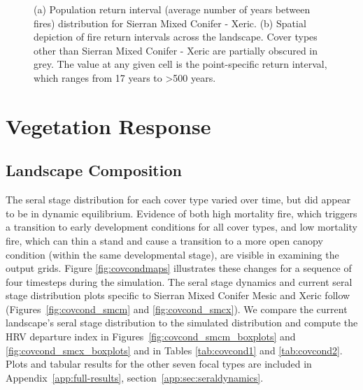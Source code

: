 \begin{figure}[!htbp]
  \centering
  \caption{(a) Population return interval (average number of years between fires) distribution for Sierran Mixed Conifer - Xeric.  (b) Spatial depiction of fire return intervals across the landscape. Cover types other than Sierran Mixed Conifer - Xeric are partially obscured in grey. The value at any given cell is the point-specific return interval, which ranges from 17 years to \textgreater 500 years.}
\label{fig:preturn_smcx}
\end{figure}

\clearpage



\section{Vegetation Response}
\label{subsec:HRVvegresponse}

\subsection{Landscape Composition} 

The seral stage distribution for each cover type varied over time, but did appear to be in dynamic equilibrium. Evidence of both high mortality fire, which triggers a transition to early development conditions for all cover types, and low mortality fire, which can thin a stand and cause a transition to a more open canopy condition (within the same developmental stage), are visible in examining the output grids. Figure \ref{fig:covcondmaps} illustrates these changes for a sequence of four timesteps during the simulation. The seral stage dynamics and current seral stage distribution plots specific to Sierran Mixed Conifer Mesic and Xeric follow (Figures~\ref{fig:covcond_smcm} and \ref{fig:covcond_smcx}).  We compare the current landscape's seral stage distribution to the simulated distribution and compute the HRV departure index in Figures~\ref{fig:covcond_smcm_boxplots} and \ref{fig:covcond_smcx_boxplots} and in Tables \ref{tab:covcond1} and \ref{tab:covcond2}. Plots and tabular results for the other seven focal types are included in Appendix~\ref{app:full-results}, section~\ref{app:sec:seraldynamics}.

